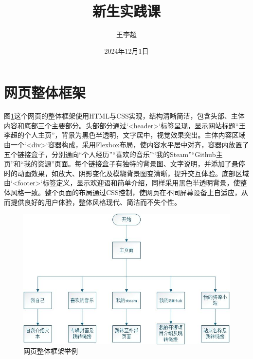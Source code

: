 \documentclass[supercite]{Experimental_Report}
\title{~~~~~~新生实践课~~~~~~}
\author{王李超}
\date{2024年12月1日}
\theoremstyle{definition}
\begin{document}
\maketitle

\clearpage


\tableofcontents[level=2]
\clearpage


\section{网页整体框架}

图\ref{fig1-1}这个网页的整体框架使用HTML与CSS实现，结构清晰简洁，包含头部、主体内容和底部三个主要部分。头部部分通过`<header>`标签呈现，显示网站标题“王李超的个人主页”，背景为黑色半透明，文字居中，视觉效果突出。主体内容区域由一个`<div>`容器构成，采用Flexbox布局，使内容水平居中对齐，容器内放置了五个链接盒子，分别通向“个人经历”“喜欢的音乐”“我的Steam”“Github主页”和“我的资源”页面。每个链接盒子有独特的背景图、文字说明，并添加了悬停时的动画效果，如放大、阴影变化及模糊背景图变清晰，提升交互体验。底部区域由`<footer>`标签定义，显示欢迎语和简单介绍，同样采用黑色半透明背景，使整体风格一致。整个页面的布局通过CSS控制，使网页在不同屏幕设备上自适应，从而提供良好的用户体验，整体风格现代、简洁而不失个性。

\begin{figure}[htb] %
	\begin{center}
		\includegraphics[scale=0.80]{images/1-1.jpg}
		\caption{网页整体框架举例}
		\label{fig1-1}
	\end{center}
\end{figure}
\end{document}
